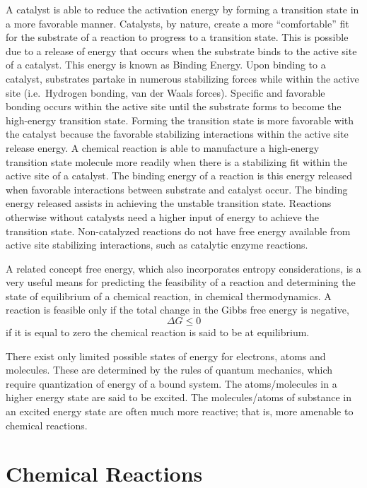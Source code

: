 \documentclass[
]{book}
\begin{document}
A catalyst is able to reduce the activation energy by forming a transition state in a more favorable manner. Catalysts, by nature, create a more ``comfortable'' fit for the substrate of a reaction to progress to a transition state. This is possible due to a release of energy that occurs when the substrate binds to the active site of a catalyst. This energy is known as Binding Energy. Upon binding to a catalyst, substrates partake in numerous stabilizing forces while within the active site (i.e.~Hydrogen bonding, van der Waals forces). Specific and favorable bonding occurs within the active site until the substrate forms to become the high-energy transition state. Forming the transition state is more favorable with the catalyst because the favorable stabilizing interactions within the active site release energy. A chemical reaction is able to manufacture a high-energy transition state molecule more readily when there is a stabilizing fit within the active site of a catalyst. The binding energy of a reaction is this energy released when favorable interactions between substrate and catalyst occur. The binding energy released assists in achieving the unstable transition state. Reactions otherwise without catalysts need a higher input of energy to achieve the transition state. Non-catalyzed reactions do not have free energy available from active site stabilizing interactions, such as catalytic enzyme reactions.

A related concept free energy, which also incorporates entropy considerations, is a very useful means for predicting the feasibility of a reaction and determining the state of equilibrium of a chemical reaction, in chemical thermodynamics. A reaction is feasible only if the total change in the Gibbs free energy is negative, \[ \Delta G \leq 0 \] if it is equal to zero the chemical reaction is said to be at equilibrium.

There exist only limited possible states of energy for electrons, atoms and molecules. These are determined by the rules of quantum mechanics, which require quantization of energy of a bound system. The atoms/molecules in a higher energy state are said to be excited. The molecules/atoms of substance in an excited energy state are often much more reactive; that is, more amenable to chemical reactions.

\hypertarget{chemical-reactions}{%
\section{Chemical Reactions}\label{chemical-reactions}}
\end{document}
